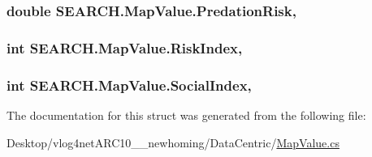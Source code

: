 \hypertarget{struct_s_e_a_r_c_h_1_1_map_value_a7731481da862699355c683c2a980e960}{
\subsubsection[{Predation\-Risk}]{\setlength{\rightskip}{0pt plus 5cm}double S\-E\-A\-R\-C\-H.\-Map\-Value.\-Predation\-Risk\hspace{0.3cm}{\ttfamily [get]}, {\ttfamily [set]}}}\label{struct_s_e_a_r_c_h_1_1_map_value_a7731481da862699355c683c2a980e960}
\hypertarget{struct_s_e_a_r_c_h_1_1_map_value_a740cf54c78bf4f868baab6ad3a590dd3}{
\subsubsection[{Risk\-Index}]{\setlength{\rightskip}{0pt plus 5cm}int S\-E\-A\-R\-C\-H.\-Map\-Value.\-Risk\-Index\hspace{0.3cm}{\ttfamily [get]}, {\ttfamily [set]}}}\label{struct_s_e_a_r_c_h_1_1_map_value_a740cf54c78bf4f868baab6ad3a590dd3}
\hypertarget{struct_s_e_a_r_c_h_1_1_map_value_a30084a0a1fd7c7810984897e41ff1b44}{
\subsubsection[{Social\-Index}]{\setlength{\rightskip}{0pt plus 5cm}int S\-E\-A\-R\-C\-H.\-Map\-Value.\-Social\-Index\hspace{0.3cm}{\ttfamily [get]}, {\ttfamily [set]}}}\label{struct_s_e_a_r_c_h_1_1_map_value_a30084a0a1fd7c7810984897e41ff1b44}


The documentation for this struct was generated from the following file\-:\begin{DoxyCompactItemize}
\item 
Desktop/vlog4net\-A\-R\-C10\-\_\-\_\-newhoming/\-Data\-Centric/\hyperlink{_map_value_8cs}{Map\-Value.\-cs}\end{DoxyCompactItemize}
